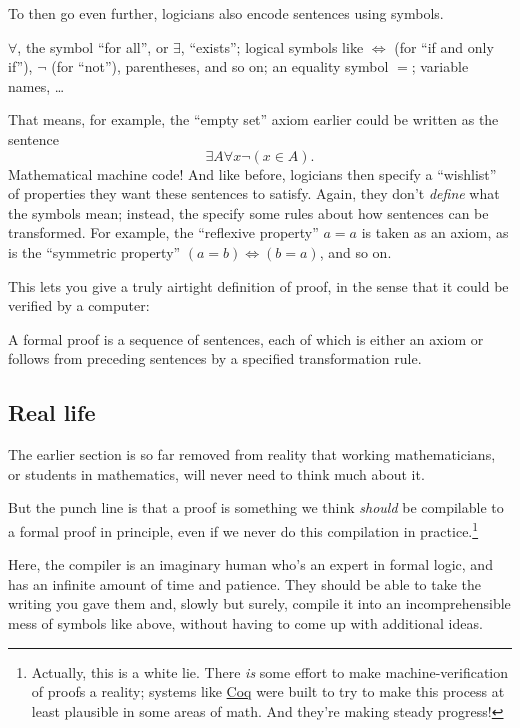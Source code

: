 \documentclass[11pt]{scrartcl}
\begin{document}
To then go even further, logicians also encode sentences using symbols.
\begin{itemize}
  \ii $\forall$, the symbol ``for all'', or $\exists$, ``exists'';
  \ii logical symbols like $\iff$ (for ``if and only if''),
  $\neg$ (for ``not''), parentheses, and so on;
  \ii an equality symbol $=$;
  \ii variable names,
  \ii \dots
\end{itemize}
That means, for example, the ``empty set'' axiom earlier could be written as
the sentence
\[ \exists A \forall x \neg (x \in A). \]
Mathematical machine code!
And like before, logicians then specify a ``wishlist'' of properties
they want these sentences to satisfy.
Again, they don't \emph{define} what the symbols mean;
instead, the specify some rules about how sentences can be transformed.
For example, the ``reflexive property'' $a=a$ is taken as an axiom,
as is the ``symmetric property'' $(a=b) \iff (b=a)$, and so on.

This lets you give a truly airtight definition of proof,
in the sense that it could be verified by a computer:
\begin{definition}
  A \alert{formal proof} is a sequence of sentences,
  each of which is either an axiom
  or follows from preceding sentences by a specified transformation rule.
\end{definition}

\subsection{Real life}
The earlier section is so far removed from reality
that working mathematicians, or students in mathematics,
will never need to think much about it.

But the punch line is that a proof is something we think
\emph{should} be compilable to a formal proof in principle,
even if we never do this compilation in practice.\footnote{Actually,
  this is a white lie.
  There \emph{is} some effort to make machine-verification of proofs a reality;
  systems like \href{https://en.wikipedia.org/wiki/Coq}{Coq}
  were built to try to make this process at least plausible in some areas of math.
  And they're making steady progress!}

Here, the compiler is an imaginary human who's an expert in formal logic,
and has an infinite amount of time and patience.
They should be able to take the writing you gave them and, slowly but surely,
compile it into an incomprehensible mess of symbols like above,
without having to come up with additional ideas.
\end{document}
